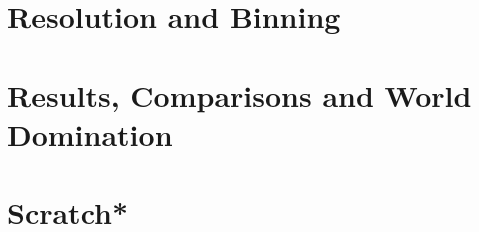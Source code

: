 \documentclass[11pt]{article}
\begin{document}
\section{Resolution and Binning}


\section{Results, Comparisons and World Domination}



\newpage
\section{Scratch*}
\end{document}
